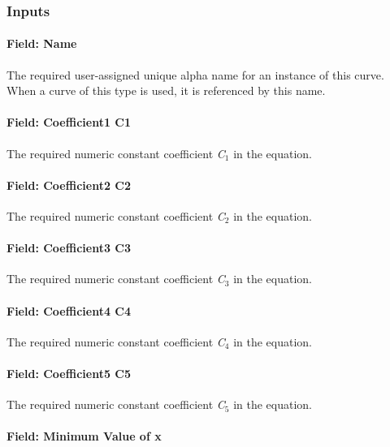 \subsubsection{Inputs}\label{inputs-14-008}

\paragraph{Field: Name}\label{field-name-14-005}

The required user-assigned unique alpha name for an instance of this curve. When a curve of this type is used, it is referenced by this name.

\paragraph{Field: Coefficient1 C1}\label{field-coefficient1-c1-1}

The required numeric constant coefficient \emph{C\(_{1}\)} in the equation.

\paragraph{Field: Coefficient2 C2}\label{field-coefficient2-c2-1}

The required numeric constant coefficient \emph{C\(_{2}\)} in the equation.

\paragraph{Field: Coefficient3 C3}\label{field-coefficient3-c3-1}

The required numeric constant coefficient \emph{C\(_{3}\)} in the equation.

\paragraph{Field: Coefficient4 C4}\label{field-coefficient4-c4-1}

The required numeric constant coefficient \emph{C\(_{4}\)} in the equation.

\paragraph{Field: Coefficient5 C5}\label{field-coefficient5-c5}

The required numeric constant coefficient \emph{C\(_{5}\)} in the equation.

\paragraph{Field: Minimum Value of x}\label{field-minimum-value-of-x-13}

